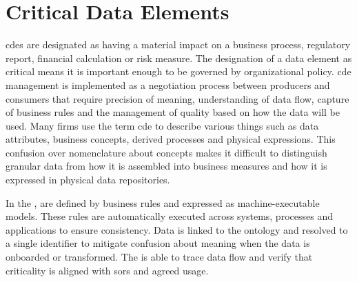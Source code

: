 \section{Critical Data Elements}\label{sec:ekg-mm-b-4-5} %

\Glspl{cde} are designated as having a material impact on a business process, regulatory report,
financial calculation or risk measure.
The designation of a data element as critical means it is important enough to be governed by organizational policy.
\Gls{cde} management is implemented as a negotiation process between producers and consumers that require
precision of meaning, understanding of data flow, capture of business rules and the management of quality based on
how the data will be used.
Many firms use the term \gls{cde} to describe various things such as data attributes, business concepts,
derived processes and physical expressions.
This confusion over nomenclature about concepts makes it difficult to distinguish granular data from how it is
assembled into business measures and how it is expressed in physical data repositories.

\ekgmmContextSection

In the ,
 are defined by  business rules and expressed as
machine-executable models.
These rules are automatically executed across systems, processes and applications to ensure consistency.
Data is linked to the ontology and resolved to a single identifier to mitigate confusion about meaning when the
data is onboarded or transformed.
The  is able to trace data flow and verify that criticality is aligned with \glspl{sor}
and agreed usage.

